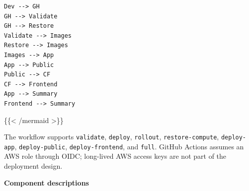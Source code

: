 \begin{verbatim}
Dev --> GH
GH --> Validate
GH --> Restore
Validate --> Images
Restore --> Images
Images --> App
App --> Public
Public --> CF
CF --> Frontend
App --> Summary
Frontend --> Summary
\end{verbatim}

\{\{\textless{} /mermaid \textgreater\}\}

The workflow supports \texttt{validate}, \texttt{deploy},
\texttt{rollout}, \texttt{restore-\allowbreak{}compute}, \texttt{deploy-\allowbreak{}app},
\texttt{deploy-\allowbreak{}public}, \texttt{deploy-\allowbreak{}frontend}, and \texttt{full}.
GitHub Actions assumes an AWS role through OIDC; long-lived AWS access
keys are not part of the deployment design.

\vspace{0.5em}\noindent\textbf{Component descriptions}\par

